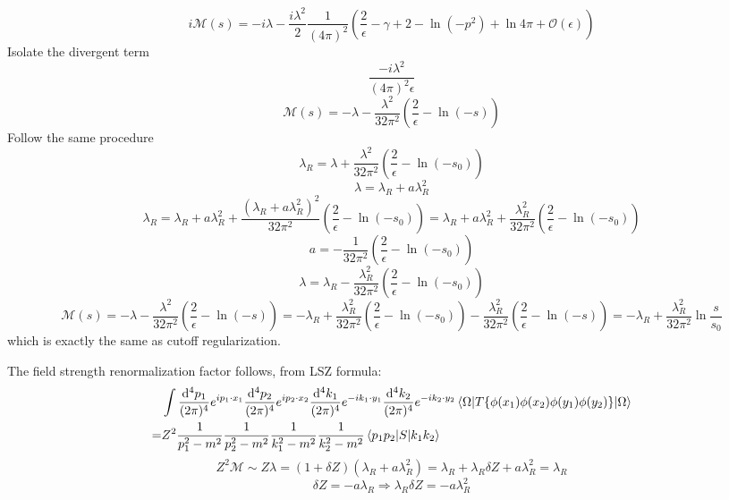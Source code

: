 \documentclass{article}
\newcommand{\g}{\gamma}
\newcommand{\la}{\lambda}
\begin{document}
\begin{enumerate}[(i)]
  $$i\mathcal{M}(s)=-i\la-\frac{i\lambda^2}{2}\frac{1}{(4\pi)^{2}}(\frac{2}{\epsilon}-\g+2-\ln{(-p^2)}+\ln{4\pi}+\mathcal{O}(\epsilon))$$
  Isolate the divergent term
  $$\frac{-i\lambda^2}{(4\pi)^{2}\epsilon}$$
  $$\mathcal{M}(s)=-\la-\frac{\lambda^2}{32\pi^2}(\frac{2}{\epsilon}-\ln{(-s)})$$
  Follow the same procedure
  $$\la_R=\lambda+\frac{\la^2}{32\pi^2}(\frac{2}{\epsilon}-\ln{(-s_0)})$$
  $$\la=\la_R+a\la_R^2$$
  $$\la_R=\la_R+a\la_R^2+\frac{(\la_R+a\la_R^2)^2}{32\pi^2}(\frac{2}{\epsilon}-\ln{(-s_0)})=\la_R+a\la_R^2+\frac{\la_R^2}{32\pi^2}(\frac{2}{\epsilon}-\ln{(-s_0)})$$
  $$a=-\frac{1}{32\pi^2}(\frac{2}{\epsilon}-\ln{(-s_0)})$$
  $$\la=\la_R-\frac{\la_R^2}{32\pi^2}(\frac{2}{\epsilon}-\ln{(-s_0)})$$
  $$\mathcal{M}(s)=-\la-\frac{\lambda^2}{32\pi^2}(\frac{2}{\epsilon}-\ln{(-s)})=-\la_R+\frac{\la_R^2}{32\pi^2}(\frac{2}{\epsilon}-\ln{(-s_0)})-\frac{\lambda_R^2}{32\pi^2}(\frac{2}{\epsilon}-\ln{(-s)})=-\la_R+\frac{\la_R^2}{32\pi^2}\ln{\frac{s}{s_0}}$$
  which is exactly the same as cutoff regularization.

  The field strength renormalization factor follows, from LSZ formula:
  \begin{align*}
    &\int\frac{\dd^4 p_1}{(2\pi)^4}e^{ip_1\cdot x_1}\frac{\dd^4 p_2}{(2\pi)^4}e^{ip_2\cdot x_2}\frac{\dd^4 k_1}{(2\pi)^4}e^{-ik_1\cdot y_1}\frac{\dd^4k_2}{(2\pi)^4}e^{-ik_2\cdot y_2}\mel{\Omega}{T\{\phi(x_1)\phi(x_2)\phi(y_1)\phi(y_2)\}}{\Omega}\\
    =&Z^2\frac{1}{p_1^2-m^2}\frac{1}{p_2^2-m^2}\frac{1}{k_1^2-m^2}\frac{1}{k_2^2-m^2}\mel{p_1p_2}{S}{k_1k_2}
  \end{align*}
  $$Z^2\mathcal{M}\sim Z\la=(1+\delta Z)(\la_R+a\la_R^2)=\la_R+\la_R\delta Z+a\la^2_R=\la_R$$
  $$\delta Z=-a\la_R\Longrightarrow \la_R\delta Z=-a\la_R^2$$
\end{enumerate}
\end{document}
